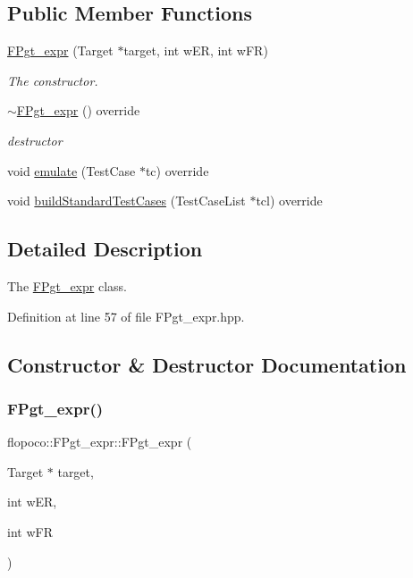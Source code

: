 \subsection*{Public Member Functions}
\begin{DoxyCompactItemize}
\item 
\hyperlink{classflopoco_1_1FPgt__expr_a6285602a1c8a5bceaf679843f9063942}{F\+Pgt\+\_\+expr} (Target $\ast$target, int w\+ER, int w\+FR)
\begin{DoxyCompactList}\small\item\em The constructor. \end{DoxyCompactList}\item 
\hyperlink{classflopoco_1_1FPgt__expr_a9180f465b46d47f3c16bb156dc3f89a6}{$\sim$\+F\+Pgt\+\_\+expr} () override
\begin{DoxyCompactList}\small\item\em destructor \end{DoxyCompactList}\item 
void \hyperlink{classflopoco_1_1FPgt__expr_ad76819c6f9549929336a4cf625169004}{emulate} (Test\+Case $\ast$tc) override
\item 
void \hyperlink{classflopoco_1_1FPgt__expr_a85e2958edaad0ca50a44744f5113636e}{build\+Standard\+Test\+Cases} (Test\+Case\+List $\ast$tcl) override
\end{DoxyCompactItemize}


\subsection{Detailed Description}
The \hyperlink{classflopoco_1_1FPgt__expr}{F\+Pgt\+\_\+expr} class. 

Definition at line 57 of file F\+Pgt\+\_\+expr.\+hpp.



\subsection{Constructor \& Destructor Documentation}
\mbox{\label{classflopoco_1_1FPgt__expr_a6285602a1c8a5bceaf679843f9063942}} 
\subsubsection{\texorpdfstring{F\+Pgt\+\_\+expr()}{FPgt\_expr()}}
{\footnotesize\ttfamily flopoco\+::\+F\+Pgt\+\_\+expr\+::\+F\+Pgt\+\_\+expr (\begin{DoxyParamCaption}\item[{Target $\ast$}]{target,  }\item[{int}]{w\+ER,  }\item[{int}]{w\+FR }\end{DoxyParamCaption})}



